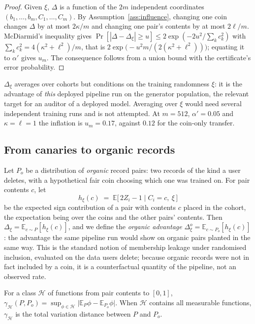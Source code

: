 \begin{proof}
Given $\xi$, $\Delta$ is a function of the $2m$ independent coordinates
$(b_1,\dots,b_m,C_1,\dots,C_m)$. By Assumption~\ref{ass:influence}, changing one coin
changes $\Delta$ by at most $2\kappa/m$ and changing one pair's contents by at most
$2\ell/m$. McDiarmid's inequality \citep{mcdiarmid1989bounded} gives
$\Pr[|\Delta-\Delta_\xi|\ge u]\le 2\exp(-2u^2/\sum_k c_k^2)$ with
$\sum_k c_k^2=4(\kappa^2+\ell^2)/m$, that is
$2\exp\bigl(-u^2m/(2(\kappa^2+\ell^2))\bigr)$; equating it to $\alpha'$ gives $u_m$. The
consequence follows from a union bound with the certificate's error probability.
\end{proof}

$\Delta_\xi$ averages over cohorts but conditions on the training randomness $\xi$: it
is the advantage of \emph{this} deployed pipeline run on the generator population, the
relevant target for an auditor of a deployed model. Averaging over $\xi$ would need
several independent training runs and is not attempted. At $m=512$, $\alpha'=0.05$ and
$\kappa=\ell=1$ the inflation is $u_m=0.17$, against $0.12$ for the coin-only transfer.

\subsection{From canaries to organic records}

Let $P_o$ be a distribution of \emph{organic} record pairs: two records of the kind a
user deletes, with a hypothetical fair coin choosing which one was trained on. For pair
contents $c$, let
\[
h_\xi(c) \;=\; \mathbb{E}\bigl[\,2Z_i-1 \;\big|\; C_i=c,\ \xi\,\bigr]
\]
be the expected sign contribution of a pair with contents $c$ placed in the cohort,
the expectation being over the coins and the other pairs' contents. Then
$\Delta_\xi=\mathbb{E}_{c\sim P}[h_\xi(c)]$, and we define the \emph{organic advantage}
$\Delta^o_\xi=\mathbb{E}_{c\sim P_o}[h_\xi(c)]$: the advantage the same pipeline run
would show on organic pairs planted in the same way. This is the standard notion of
membership leakage under randomised inclusion, evaluated on the data users delete;
because organic records were not in fact included by a coin, it is a counterfactual
quantity of the pipeline, not an observed rate.

\begin{definition}\label{def:gamma}
For a class $\mathcal H$ of functions from pair contents to $[0,1]$,
$\gamma_{\mathcal H}(P,P_o)=\sup_{\phi\in\mathcal H}\bigl|\mathbb{E}_P\phi-\mathbb{E}_{P_o}\phi\bigr|$.
When $\mathcal H$ contains all measurable functions, $\gamma_{\mathcal H}$ is the total
variation distance between $P$ and $P_o$.
\end{definition}

